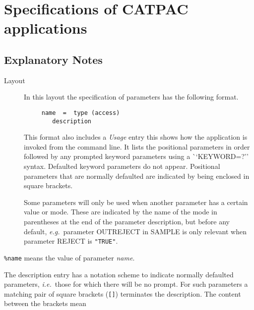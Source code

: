 \newpage
\section{Specifications of CATPAC applications}
\label{ap:full}
\subsection{Explanatory Notes}

\begin{description}

\item [Layout]
In this layout the specification of parameters has the following
format. 

\begin{verbatim}
     name  =  type (access)
        description
\end{verbatim}

This format also includes a {\em Usage} entry this shows how the
application is invoked from the command line.   It lists the positional
parameters in order followed by any prompted keyword parameters using 
a {\mbox ``KEYWORD=?''} syntax.  Defaulted
keyword parameters do not appear.  Positional parameters
that are normally defaulted are indicated by being enclosed in square
brackets.

Some parameters will only be used when another parameter has a certain
value or mode. These are indicated by the name of the mode in
parentheses at the end of the parameter description, but before any
default, {\it e.g.}\ parameter OUTREJECT in SAMPLE is only
relevant when parameter REJECT is {\tt "TRUE"}.

\end {description}

\newcommand {\mantt}{\tt}

{\mantt \%name} means the value of parameter {\it name}.

The description entry has a notation scheme to indicate 
normally defaulted parameters, {\it i.e.}\ those for which there will
be no prompt.
For such parameters a matching pair of square brackets ({\mantt []})
terminates the description.  The content between the brackets mean

